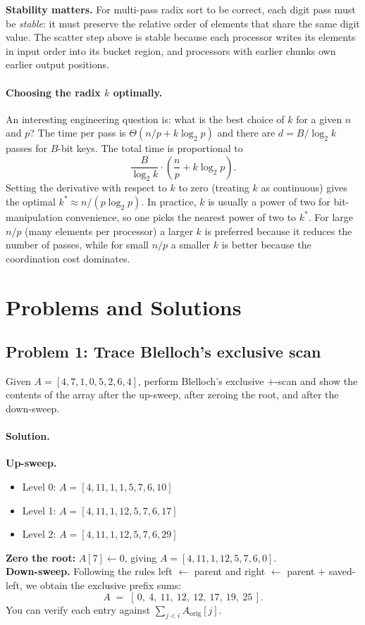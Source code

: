 \begin{ppnote}
\textbf{Stability matters.} For multi-pass radix sort to be correct,
each digit pass must be \emph{stable}: it must preserve the relative
order of elements that share the same digit value. The scatter step
above is stable because each processor writes its elements in input
order into its bucket region, and processors with earlier chunks own
earlier output positions.
\end{ppnote}

\paragraph{Choosing the radix $k$ optimally.}
An interesting engineering question is: what is the best choice of $k$
for a given $n$ and $p$? The time per pass is $\Theta(n/p + k \log_2 p)$
and there are $d = B / \log_2 k$ passes for $B$-bit keys. The total time
is proportional to
\[
\frac{B}{\log_2 k} \cdot \left(\frac{n}{p} + k \log_2 p\right).
\]
Setting the derivative with respect to $k$ to zero (treating $k$ as
continuous) gives the optimal $k^* \approx n / (p \log_2 p)$. In
practice, $k$ is usually a power of two for bit-manipulation convenience,
so one picks the nearest power of two to $k^*$. For large $n/p$ (many
elements per processor) a larger $k$ is preferred because it reduces the
number of passes, while for small $n/p$ a smaller $k$ is better because
the coordination cost dominates.

\section{Problems and Solutions}
\label{sec:problems}

\subsection{Problem 1: Trace Blelloch's exclusive scan}
Given $A = [4, 7, 1, 0, 5, 2, 6, 4]$, perform Blelloch's exclusive
$+$-scan and show the contents of the array after the up-sweep, after
zeroing the root, and after the down-sweep.

\paragraph{Solution.}
\textbf{Up-sweep.}
\begin{itemize}[leftmargin=*]
  \item Level 0: $A = [4, 11, 1, 1, 5, 7, 6, 10]$
  \item Level 1: $A = [4, 11, 1, 12, 5, 7, 6, 17]$
  \item Level 2: $A = [4, 11, 1, 12, 5, 7, 6, 29]$
\end{itemize}
\textbf{Zero the root:} $A[7] \leftarrow 0$, giving
$A = [4, 11, 1, 12, 5, 7, 6, 0]$.\\
\textbf{Down-sweep.} Following the rules left $\leftarrow$ parent and
right $\leftarrow$ parent + saved-left, we obtain the exclusive prefix
sums:
\[
A \;=\; [\,0,\ 4,\ 11,\ 12,\ 12,\ 17,\ 19,\ 25\,].
\]
You can verify each entry against $\sum_{j<i} A_{\mathrm{orig}}[j]$.

